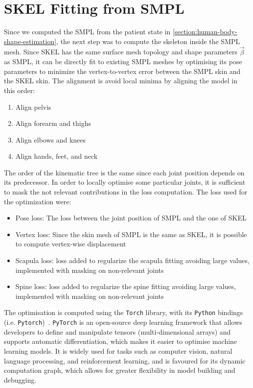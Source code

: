 \section{SKEL Fitting from SMPL}
Since we computed the SMPL from the patient state in \autoref{section:human-body-shape-estimation}, the next step was to compute the skeleton inside the SMPL mesh. Since SKEL has the same surface mesh topology and shape parameters $\vec{\beta}$ as SMPL, it can be directly fit to existing SMPL meshes by optimising its pose parameters to minimize the vertex-to-vertex
error between the SMPL skin and the SKEL skin. The alignment is avoid local minima by aligning the model in this order:
\begin{enumerate}
\item Align pelvis
\item Align forearm and thighs
\item Align elbows and knees 
\item Align hands, feet, and neck
\end{enumerate}
The order of the kinematic tree is the same since each joint position depends on its predecessor. In order to locally optimise some particular joints, it is sufficient to mask the not relevant contributions in the loss computation. The loss used for the optimization were:
\begin{itemize}
    \item Pose loss: The loss between the joint position of SMPL and the one of SKEL
    \item Vertex loss: Since the skin mesh of SMPL is the same as SKEL, it is possible to compute vertex-wise displacement
    \item Scapula loss: loss added to regularize the scapula fitting avoiding large values, implemented with masking on non-relevant joints
    \item Spine loss: loss added to regularize the spine fitting avoiding large values, implemented with masking on non-relevant joints
\end{itemize}
The optimisation is computed using the \verb|Torch| library, with its \verb|Python| bindings (i.e. \verb|Pytorch|)~\cite{torch2019paszke}. \verb|PyTorch| is an open-source deep learning framework that allows developers to define and manipulate tensors (multi-dimensional arrays) and supports automatic differentiation, which makes it easier to optimise machine learning models. It is widely used for tasks such as computer vision, natural language processing, and reinforcement learning, and is favoured for its dynamic computation graph, which allows for greater flexibility in model building and debugging. 
